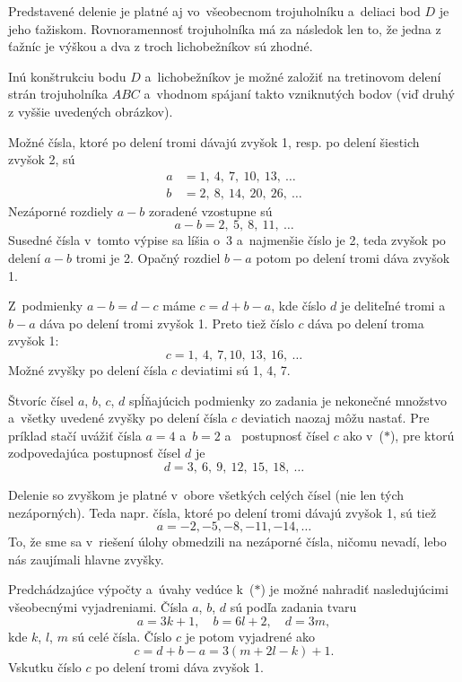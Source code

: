 {\poznamky
Predstavené delenie je platné aj vo~všeobecnom trojuholníku a~deliaci bod $D$ je jeho ťažiskom.
Rovnoramennosť trojuholníka má za následok len to, že jedna z ťažníc je výškou a dva z troch lichobežníkov sú zhodné.

Inú konštrukciu bodu $D$ a~lichobežníkov je možné založiť na tretinovom delení strán trojuholníka $ABC$ a~vhodnom spájaní takto vzniknutých bodov (viď druhý z vyššie uvedených obrázkov).
}

{%
Možné čísla, ktoré po delení tromi dávajú zvyšok 1, resp. po delení šiestich zvyšok 2, sú
$$
\begin{aligned}
	a &= 1,\ 4,\ 7,\ 10,\ 13,\ \dots \\
	b &= 2,\ 8,\ 14,\ 20,\ 26,\ \dots
\end{aligned}
$$
Nezáporné rozdiely $a-b$ zoradené vzostupne sú
$$
a-b = 2,\ 5,\ 8,\ 11,\ \dots
$$
Susedné čísla v~tomto výpise sa líšia o~3 a~najmenšie číslo je 2, teda zvyšok po delení $a-b$ tromi je 2.
Opačný rozdiel $b-a$ potom po delení tromi dáva zvyšok 1.

Z~podmienky $a-b=d-c$ máme $c=d+b-a$, kde číslo $d$ je deliteľné tromi a~$b-a$ dáva po delení tromi zvyšok 1.
Preto tiež číslo $c$ dáva po delení troma zvyšok 1:
$$
c = 1,\ 4,\ 7, 10,\ 13,\ 16,\ \dots \tag{$*$}
$$
Možné zvyšky po delení čísla $c$ deviatimi sú 1, 4, 7.

\poznamky
Štvoríc čísel $a$, $b$, $c$, $d$ spĺňajúcich podmienky zo zadania je nekonečné množstvo a~všetky uvedené zvyšky po delení čísla $c$ deviatich naozaj môžu nastať.
Pre príklad stačí uvážiť čísla $a=4$ a~$b=2$ a~ postupnosť čísel $c$ ako v~($*$), pre ktorú zodpovedajúca postupnosť čísel $d$ je
$$
d = 3,\ 6,\ 9,\ 12,\ 15,\ 18,\ \dots
$$

Delenie so zvyškom je platné v~obore všetkých celých čísel (nie len tých nezáporných).
Teda napr. čísla, ktoré po delení tromi dávajú zvyšok 1, sú tiež
$$
a = -2, -5, -8, -11, -14, \dots
$$
To, že sme sa v~riešení úlohy obmedzili na nezáporné čísla, ničomu nevadí, lebo nás zaujímali hlavne zvyšky.

Predchádzajúce výpočty a~úvahy vedúce k~($*$) je možné nahradiť nasledujúcimi všeobecnými vyjadreniami.
Čísla $a$, $b$, $d$ sú podľa zadania tvaru
$$
a =3k+1,\quad b=6l+2,\quad d=3m,
$$
kde $k$, $l$, $m$ sú celé čísla.
Číslo $c$ je potom vyjadrené ako
$$
c =d+b-a=3(m+2l-k)+1.
$$
Vskutku číslo $c$ po delení tromi dáva zvyšok 1.
}

